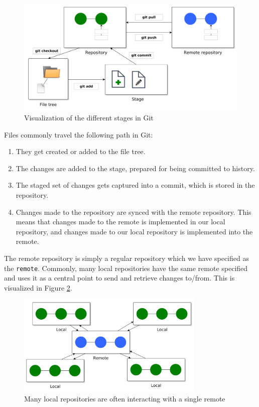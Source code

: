 \documentclass[../main/git_course_main.tex]{subfiles}
\begin{document}
	\begin{figure}[h!]
		\centering
		\includegraphics[width=1.0\textwidth]{../visualizations/chapter5/51_stages_including_remote.pdf}
		\caption{Visualization of the different stages in Git}
		\label{fig:all_stages_visualized}
	\end{figure}
	
	Files commonly travel the following path in Git:
	
	\begin{enumerate}
		\item They get created or added to the file tree.
		\item The changes are added to the stage, prepared for being committed to history.
		\item The staged set of changes gets captured into a commit, which is stored in the repository.
		\item Changes made to the repository are synced with the remote repository. This means that changes made to the remote is implemented in our local repository, and changes made to our local repository is implemented into the remote.
	\end{enumerate}
	
	The remote repository is simply a regular repository which we have specified as the \verb$remote$. Commonly, many local repositories have the same remote specified and uses it as  a central point to send and retrieve changes to/from. This is visualized in Figure \ref{fig:local_remote_repos}.
	
	\begin{figure}[h!]
		\centering
		\includegraphics[width=0.8\textwidth]{../visualizations/chapter5/52_many_interacting_with_remote.pdf}
		\caption{Many local repositories are often interacting with a single remote}
		\label{fig:local_remote_repos}
	\end{figure}
	
\end{document}
